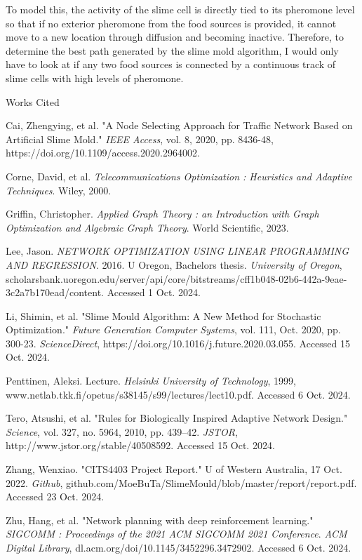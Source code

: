 \documentclass[11pt]{article}
\begin{document}
To model this, the activity of the slime cell is directly tied to its
pheromone level so that if no exterior pheromone from the food sources
is provided, it cannot move to a new location through diffusion and
becoming inactive. Therefore, to determine the best path generated by
the slime mold algorithm, I would only have to look at if any two food
sources is connected by a continuous track of slime cells with high
levels of pheromone.

Works Cited

Cai, Zhengying, et al. "A Node Selecting Approach for Traffic Network
Based on Artificial Slime Mold." \emph{IEEE Access}, vol. 8, 2020, pp.
8436-48, https://doi.org/10.1109/access.2020.2964002.

Corne, David, et al. \emph{Telecommunications Optimization : Heuristics
and Adaptive Techniques}. Wiley, 2000.

Griffin, Christopher. \emph{Applied Graph Theory : an Introduction with
Graph Optimization and Algebraic Graph Theory}. World Scientific, 2023.

Lee, Jason. \emph{NETWORK OPTIMIZATION USING LINEAR PROGRAMMING AND
REGRESSION}. 2016. U Oregon, Bachelor\textquotesingle s thesis.
\emph{University of Oregon},
scholarsbank.uoregon.edu/server/api/core/bitstreams/cff1b048-02b6-442a-9eae-3c2a7b170ead/content.
Accessed 1 Oct. 2024.

Li, Shimin, et al. "Slime Mould Algorithm: A New Method for Stochastic
Optimization." \emph{Future Generation Computer Systems}, vol. 111, Oct.
2020, pp. 300-23. \emph{ScienceDirect},
https://doi.org/10.1016/j.future.2020.03.055. Accessed 15 Oct. 2024.

Penttinen, Aleksi. Lecture. \emph{Helsinki University of Technology},
1999, www.netlab.tkk.fi/opetus/s38145/s99/lectures/lect10.pdf. Accessed
6 Oct. 2024.

Tero, Atsushi, et al. "Rules for Biologically Inspired Adaptive Network
Design." \emph{Science}, vol. 327, no. 5964, 2010, pp. 439--42.
\emph{JSTOR}, http://www.jstor.org/stable/40508592. Accessed 15 Oct.
2024.

Zhang, Wenxiao. "CITS4403 Project Report." U of Western Australia, 17
Oct. 2022. \emph{Github},
github.com/MoeBuTa/SlimeMould/blob/master/report/report.pdf. Accessed 23
Oct. 2024.

Zhu, Hang, et al. "Network planning with deep reinforcement learning."
\emph{SIGCOMM : Proceedings of the 2021 ACM SIGCOMM
2021 Conference}. \emph{ACM Digital Library},
dl.acm.org/doi/10.1145/3452296.3472902. Accessed 6 Oct. 2024.
\end{document}

